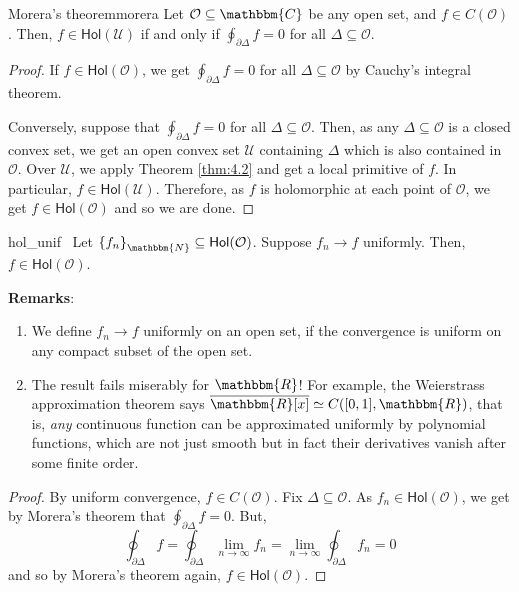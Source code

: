 \documentclass[../ComplexAnalysis_Notes.tex]{subfiles}
\begin{document}
\begin{Thm}{Morera's theorem}{morera}
 Let \( \mathcal{O} \subseteq \mathbbm{C} \) be any open set, and \( f \in C(\mathcal{O}) \). Then, \( f \in \textsf{Hol}(\mathcal{U}) \) if and only if \( \oint_{\partial \Delta} f = 0 \) for all \( \Delta \subseteq \mathcal{O} \).
 \end{Thm}

\begin{proof} 
 If \( f \in \textsf{Hol}(\mathcal{O}) \), we get \( \oint_{\partial \Delta} f = 0 \) for all \( \Delta \subseteq \mathcal{O} \) by Cauchy's integral theorem. 
 \smallskip

 Conversely, suppose that \( \oint_{\partial \Delta} f = 0 \) for all \( \Delta \subseteq \mathcal{O} \). Then, as any \( \Delta \subseteq \mathcal{O} \) is a closed convex set, we get an open convex set \( \mathcal{U} \) containing \( \Delta \) which is also contained in \( \mathcal{O} \). Over \( \mathcal{U} \), we apply Theorem \ref{thm:4.2} and get a local primitive of \( f \). In particular, \( f \in \textsf{Hol}(\mathcal{U}) \). Therefore, as \( f \) is holomorphic at each point of \( \mathcal{O} \), we get \( f \in \textsf{Hol}(\mathcal{O}) \) and so we are done.
 \end{proof}

\begin{Thm}{}{hol_unif}
 \, Let \( \qty{f_n}_{\mathbbm{N}} \subseteq \textsf{Hol}(\mathcal{O}) \). Suppose \( f_n \to f \)  uniformly. Then, \( f \in \textsf{Hol}(\mathcal{O}) \).
 \end{Thm}

\textbf{Remarks}:\begin{enumerate}[label = (\arabic*)]
  \item We define \( f_n \to f \) uniformly on an open set, if the convergence is uniform on any compact subset of the open set.
  \item The result fails miserably for \( \mathbbm{R} \)! For example, the Weierstrass approximation theorem says \( \overline{\mathbbm{R}[x]} \simeq C([0,1], \mathbbm{R}) \), that is, \textit{any} continuous function can be approximated uniformly by polynomial functions, which are not just smooth but in fact their derivatives vanish after some finite order.
\end{enumerate}

\begin{proof} 
By uniform convergence, \( f \in C(\mathcal{O}) \). Fix \( \Delta \subseteq \mathcal{O} \). As \( f_n \in \textsf{Hol}(\mathcal{O}) \), we get by Morera's theorem that \( \oint_{\partial\Delta} f = 0 \). But,
\[ 
 \oint_{\partial\Delta} f = \oint_{\partial\Delta} \lim_{n \to \infty} f_n = \lim_{n \to \infty} \oint_{\partial\Delta} f_n = 0
 \]
 and so by Morera's theorem again, \( f \in \textsf{Hol}(\mathcal{O}) \).
\end{proof}
\end{document}
